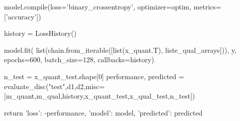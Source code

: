 \begin{pylisting}
    model.compile(loss='binary_crossentropy', optimizer=optim, metrics=['accuracy'])

    history = LossHistory()
    
    model.fit(
      list(chain.from_iterable([list(x_quant.T), liste_qual_arrays])),
      y,
      epochs=600,
      batch_size=128,
      callbacks=history)

    n_test = x_quant_test.shape[0]
    performance, predicted = evaluate_disc("test",d1,d2,misc=[m_quant,m_qual,history,x_quant_test,x_qual_test,n_test])
  
    return {'loss': -performance, 'model': model, 'predicted': predicted}

\end{pylisting}
